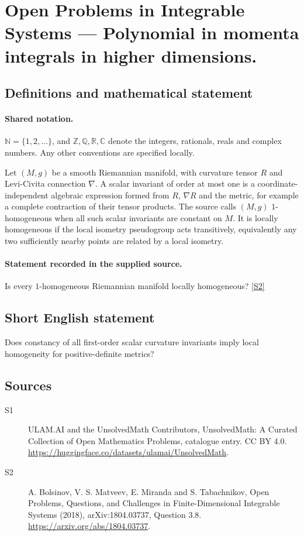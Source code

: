 \documentclass[11pt]{article}
\newcommand{\sref}[2]{\hyperlink{source:#1:#2}{[S#2]}}
\begin{document}
\section{Open Problems in Integrable Systems — Polynomial in momenta integrals in higher dimensions.}\label{statement}

\subsection{Definitions and mathematical statement}

\paragraph{Shared notation.}$\mathbb N=\{1,2,\ldots\}$, and $\mathbb Z,\mathbb Q,\mathbb R,\mathbb C$ denote the integers, rationals, reals and complex numbers. Any other conventions are specified locally.


Let $(M,g)$ be a smooth Riemannian manifold, with curvature tensor $R$ and Levi-Civita connection $\nabla$. A scalar invariant of order at most one is a coordinate-independent algebraic expression formed from $R$, $\nabla R$ and the metric, for example a complete contraction of their tensor products. The source calls $(M,g)$ $1$-homogeneous when all such scalar invariants are constant on $M$. It is locally homogeneous if the local isometry pseudogroup acts transitively, equivalently any two sufficiently nearby points are related by a local isometry.
\paragraph{Statement recorded in the supplied source.}
Is every $1$-homogeneous Riemannian manifold locally homogeneous? \sref{statement}{2}
\subsection{Short English statement}
Does constancy of all first-order scalar curvature invariants imply local homogeneity for positive-definite metrics?
\subsection{Sources}
\begin{description}
\item[\hypertarget{source:statement:1}{S1}] ULAM.AI and the UnsolvedMath Contributors, UnsolvedMath: A Curated Collection of Open Mathematics Problems, catalogue entry. CC BY 4.0. \url{https://huggingface.co/datasets/ulamai/UnsolvedMath}.
\item[\hypertarget{source:statement:2}{S2}] A. Bolsinov, V. S. Matveev, E. Miranda and S. Tabachnikov, Open Problems, Questions, and Challenges in Finite-Dimensional Integrable Systems (2018), arXiv:1804.03737, Question 3.8. \url{https://arxiv.org/abs/1804.03737}.
\end{description}
\label{end:statement}
\end{document}
